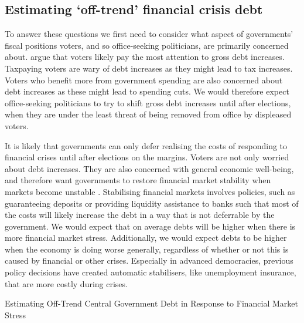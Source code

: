 \documentclass[]{article}
\begin{document}
\subsection{Estimating `off-trend' financial crisis debt}

To answer these questions we first need to consider what aspect of governments' fiscal positions voters, and so office-seeking politicians, are primarily concerned about. \cite{gandrudHallerbergWEP} argue that voters likely pay the most attention to gross debt increases. Taxpaying voters are wary of debt increases as they might lead to tax increases. Voters who benefit more from government spending are also concerned about debt increases as these might lead to spending cuts. We would therefore expect office-seeking politicians to try to shift gross debt increases until after elections, when they are under the least threat of being removed from office by displeased voters.

It is likely that governments can only defer realising the costs of responding to financial crises until after elections on the margins. Voters are not only worried about debt increases. They are also concerned with general economic well-being, and therefore want governments to restore financial market stability when markets become unstable \citep{Rosas2009}. Stabilising financial markets involves policies, such as guaranteeing deposits or providing liquidity assistance to banks such that most of the costs will likely increase the debt in a way that is not deferrable by the government. We would expect that on average debts will be higher when there is more financial market stress. Additionally, we would expect debts to be higher when the economy is doing worse generally, regardless of whether or not this is caused by financial or other crises. Especially in advanced democracies, previous policy decisions have created automatic stabilisers, like unemployment insurance, that are more costly during crises.

\begin{table}
    \caption{Estimating Off-Trend Central Government Debt in Response to Financial Market Stress}
    \label{residuals}
        \begin{center}
            
        \end{center}
\end{table}
\end{document}
